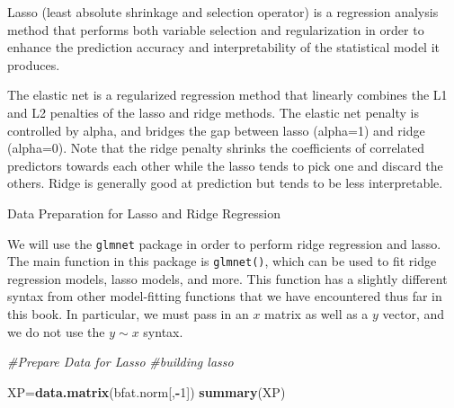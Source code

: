 \documentclass[]{article}
\newenvironment{Shaded}{\begin{snugshade}}{\end{snugshade}}
\newcommand{\KeywordTok}[1]{\textcolor[rgb]{0.13,0.29,0.53}{\textbf{#1}}}
\newcommand{\DecValTok}[1]{\textcolor[rgb]{0.00,0.00,0.81}{#1}}
\newcommand{\CommentTok}[1]{\textcolor[rgb]{0.56,0.35,0.01}{\textit{#1}}}
\newcommand{\OperatorTok}[1]{\textcolor[rgb]{0.81,0.36,0.00}{\textbf{#1}}}
\newcommand{\NormalTok}[1]{#1}
\begin{document}
Lasso (least absolute shrinkage and selection operator) is a regression
analysis method that performs both variable selection and regularization
in order to enhance the prediction accuracy and interpretability of the
statistical model it produces.

The elastic net is a regularized regression method that linearly
combines the L1 and L2 penalties of the lasso and ridge methods. The
elastic net penalty is controlled by alpha, and bridges the gap between
lasso (alpha=1) and ridge (alpha=0). Note that the ridge penalty shrinks
the coefficients of correlated predictors towards each other while the
lasso tends to pick one and discard the others. Ridge is generally good
at prediction but tends to be less interpretable.

Data Preparation for Lasso and Ridge Regression

We will use the \texttt{glmnet} package in order to perform ridge
regression and lasso. The main function in this package is
\texttt{glmnet()}, which can be used to fit ridge regression models,
lasso models, and more. This function has a slightly different syntax
from other model-fitting functions that we have encountered thus far in
this book. In particular, we must pass in an \(x\) matrix as well as a
\(y\) vector, and we do not use the \(y \sim x\) syntax.

\begin{Shaded}
\begin{Highlighting}[]
\CommentTok{#Prepare Data for Lasso}
\CommentTok{#building lasso}

\NormalTok{XP=}\KeywordTok{data.matrix}\NormalTok{(bfat.norm[,}\OperatorTok{-}\DecValTok{1}\NormalTok{])}
\KeywordTok{summary}\NormalTok{(XP)}
\end{Highlighting}
\end{Shaded}
\end{document}
